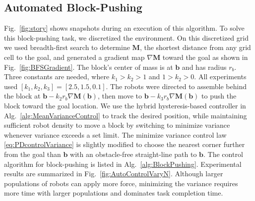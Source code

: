 \subsection{Automated Block-Pushing}
Fig.~\ref{fig:story} shows snapshots during an execution of this algorithm. To solve this block-pushing task, we discretized the environment. On this discretized grid we used breadth-first search to determine $\mathbf{M}$, the shortest distance from any grid cell to the goal, and generated a gradient map $\nabla \mathbf{M}$ toward the goal as shown in Fig.~\ref{fig:BFSGradient}.  The block's center of mass is at $\mathbf{b}$ and has radius $r_b$. 
Three constants are needed, where $k_1>k_2>1$ and $1>k_2>0$. All experiments used $[k_1,k_2,k_3] = [2.5,1.5,0.1]$.
The robots were directed to assemble behind the block at  $\mathbf{b} - k_2 r_b \nabla \mathbf{M}(\mathbf{b})$, then move to  $\mathbf{b} - k_3 r_b \nabla \mathbf{M}(\mathbf{b})$ to push the block toward the goal location. We use the hybrid hysteresis-based controller in Alg.~\ref{alg:MeanVarianceControl}  to track the desired position, while maintaining sufficient robot density to move a block by switching to minimize variance whenever variance exceeds a set limit. The minimize variance control law \eqref{eq:PDcontrolVariance} is slightly modified to choose the nearest corner further from the goal than $\mathbf{b}$ with an obstacle-free straight-line path to $\mathbf{b}$. 
The control algorithm  for block-pushing is listed in Alg.~\ref{alg:BlockPushing}. 
Experimental results are summarized in Fig.~\ref{fig:AutoControlVaryN}.  Although larger populations of robots can apply more force, minimizing the variance requires more time with larger populations and dominates task completion time.

